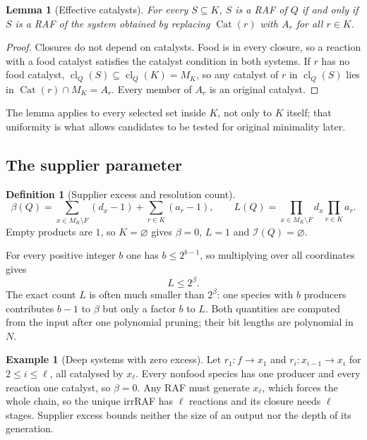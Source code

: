 \documentclass[11pt,a4paper]{article}
\theoremstyle{plain}
\newtheorem{lemma}[theorem]{Lemma}
\theoremstyle{definition}
\newtheorem{definition}[theorem]{Definition}
\newtheorem{example}[theorem]{Example}
\theoremstyle{remark}
\newcommand{\Irr}{\mathcal I}
\newcommand{\cl}{\operatorname{cl}}
\newcommand{\Cat}{\operatorname{Cat}}
\begin{document}
\begin{lemma}[Effective catalysts]\label{lem:effective}
For every $S\subseteq K$, $S$ is a RAF of $Q$ if and only if $S$ is a RAF of the system obtained by replacing $\Cat(r)$ with $A_r$ for all $r\in K$.
\end{lemma}
\begin{proof}
Closures do not depend on catalysts. Food is in every closure, so a reaction with a food catalyst satisfies the catalyst condition in both systems. If $r$ has no food catalyst, $\cl_Q(S)\subseteq\cl_Q(K)=M_K$, so any catalyst of $r$ in $\cl_Q(S)$ lies in $\Cat(r)\cap M_K=A_r$. Every member of $A_r$ is an original catalyst.
\end{proof}

The lemma applies to every selected set inside $K$, not only to $K$ itself; that uniformity is what allows candidates to be tested for original minimality later.

\subsection{The supplier parameter}\label{sec:parameter}

\begin{definition}[Supplier excess and resolution count]\label{def:beta}
\begin{equation}\label{eq:beta}
 \beta(Q)=\sum_{x\in M_K\setminus F}(d_x-1)+\sum_{r\in K}(a_r-1),\qquad
 L(Q)=\prod_{x\in M_K\setminus F}d_x\prod_{r\in K}a_r .
\end{equation}
Empty products are $1$, so $K=\varnothing$ gives $\beta=0$, $L=1$ and $\Irr(Q)=\varnothing$.
\end{definition}

For every positive integer $b$ one has $b\le2^{b-1}$, so multiplying over all coordinates gives
\begin{equation}\label{eq:Lbound}
 L\le2^{\beta}.
\end{equation}
The exact count $L$ is often much smaller than $2^\beta$: one species with $b$ producers contributes $b-1$ to $\beta$ but only a factor $b$ to $L$. Both quantities are computed from the input after one polynomial pruning; their bit lengths are polynomial in $N$.

\begin{example}[Deep systems with zero excess]\label{ex:chain}
Let $r_1\colon f\to x_1$ and $r_i\colon x_{i-1}\to x_i$ for $2\le i\le\ell$, all catalysed by $x_\ell$. Every nonfood species has one producer and every reaction one catalyst, so $\beta=0$. Any RAF must generate $x_\ell$, which forces the whole chain, so the unique irrRAF has $\ell$ reactions and its closure needs $\ell$ stages. Supplier excess bounds neither the size of an output nor the depth of its generation.
\end{example}
\end{document}

